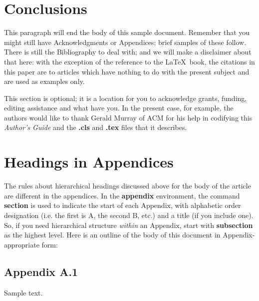 \documentclass[acmtog, authorversion]{acmart}
\begin{document}
\section{Conclusions}
This paragraph will end the body of this sample document. Remember
that you might still have Acknowledgments or Appendices; brief
samples of these follow.  There is still the Bibliography to deal
with; and we will make a disclaimer about that here: with the
exception of the reference to the \LaTeX\ book, the citations in
this paper are to articles which have nothing to do with the
present subject and are used as examples only.



\begin{acks}
This section is optional; it is a location for you to acknowledge
grants, funding, editing assistance and what have you.  In the
present case, for example, the authors would like to thank Gerald
Murray of ACM for his help in codifying this \textit{Author's
Guide} and the \textbf{.cls} and \textbf{.tex} files that it
describes.
\end{acks}




\appendix
\section{Headings in Appendices}
The rules about hierarchical headings discussed above for the body
of the article are different in the appendices. In the
\textbf{appendix} environment, the command \textbf{section} is
used to indicate the start of each Appendix, with alphabetic order
designation (i.e. the first is A, the second B, etc.) and a title
(if you include one).  So, if you need hierarchical structure
\textit{within} an Appendix, start with \textbf{subsection} as the
highest level. Here is an outline of the body of this document in
Appendix-appropriate form:
\subsection{Appendix A.1}
Sample text.
\end{document}
